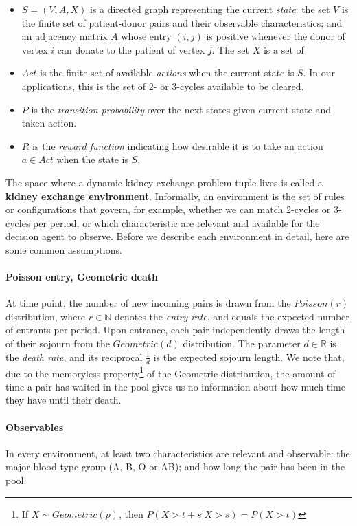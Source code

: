 \documentclass[12pt]{article}
\begin{document}
\begin{itemize}
  \item $S = (V, A, X)$ is a directed graph representing the current \emph{state}: the set $V$ is the finite set of patient-donor pairs and their observable characteristics; and an adjacency matrix $A$ whose entry $(i,j)$ is positive whenever the donor of vertex $i$ can donate to the patient of vertex $j$. The set $X$ is a set of 
  \item $Act$ is the finite set of available \emph{actions} when the current state is $S$. In our applications, this is the set of 2- or 3-cycles available to be cleared.
  \item $P$ is the \emph{transition probability} over the next states given current state and taken action.
  \item $R$ is the \emph{reward function} indicating how desirable it is to take an action $a \in Act$ when the state is $S$.
\end{itemize}

The space where a dynamic kidney exchange problem tuple lives is called a \textbf{kidney exchange environment}. Informally, an environment is the set of rules or configurations that govern, for example, whether we can match 2-cycles or 3-cycles per period, or which characteristic are relevant and available for the decision agent to observe. Before we describe each environment in detail, here are some common assumptions.

\paragraph{Poisson entry, Geometric death} At time point, the number of new incoming pairs is drawn from the $Poisson(r)$ distribution, where $r \in \mathbb{N}$ denotes the \emph{entry rate}, and equals the expected number of entrants per period. Upon entrance, each pair independently draws the length of their sojourn from the $Geometric(d)$ distribution. The parameter $d \in \mathbb{R}$ is the \emph{death rate}, and its reciprocal $\frac{1}{d}$ is the expected sojourn length. We note that, due to the memoryless property\footnote{If $X \sim Geometric(p)$, then $P(X > t+s | X > s) = P(X > t)$} of the Geometric distribution, the amount of time a pair has waited in the pool gives us no information about how much time they have until their death.

\paragraph{Observables} In every environment, at least two characteristics are relevant and observable: the major blood type group (A, B, O or AB); and how long the pair has been in the pool.
\end{document}
